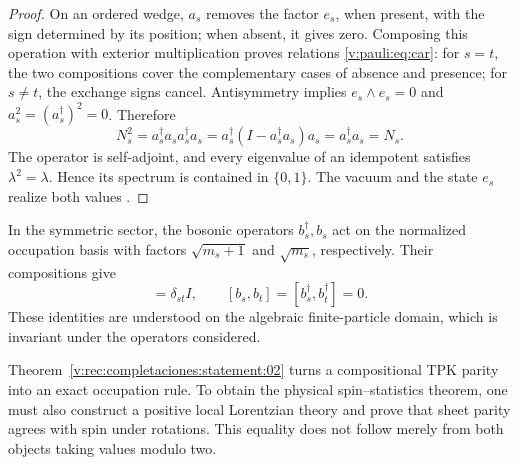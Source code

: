 \begin{proof}
On an ordered wedge, \(a_s\) removes the factor \(e_s\), when present,
with the sign determined by its position; when absent, it gives zero. Composing
this operation with exterior multiplication proves relations
\eqref{v:pauli:eq:car}: for \(s=t\), the two compositions cover the
complementary cases of absence and presence; for \(s\ne t\), the exchange
signs cancel. Antisymmetry implies
\(e_s\wedge e_s=0\) and
\(a_s^2=(a_s^\dagger)^2=0\). Therefore
\begin{equation}
 N_s^2=a_s^\dagger a_s a_s^\dagger a_s
 =a_s^\dagger(I-a_s^\dagger a_s)a_s
 =a_s^\dagger a_s=N_s.
 \label{v:pauli:eq:prueba-idempotencia}
\end{equation}
The operator is self-adjoint, and every eigenvalue of an idempotent satisfies
\(\lambda^2=\lambda\). Hence its spectrum is contained in
\(\{0,1\}\). The vacuum and the state \(e_s\) realize both values
\cite{Pauli1925,Dirac1926}.
\end{proof}

In the symmetric sector, the bosonic operators \(b_s^\dagger,b_s\)
act on the normalized occupation basis with factors
\(\sqrt{m_s+1}\) and \(\sqrt{m_s}\), respectively. Their compositions
give
\begin{equation}
 [b_s,b_t^\dagger]=\delta_{st}I,
 \qquad [b_s,b_t]=[b_s^\dagger,b_t^\dagger]=0.
 \label{v:pauli:eq:ccr}
\end{equation}
These identities are understood on the algebraic finite-particle domain,
which is invariant under the operators considered.

Theorem~\ref{v:rec:completaciones:statement:02} turns a compositional TPK parity into an exact
occupation rule. To obtain the physical spin--statistics theorem, one must
also construct a positive local Lorentzian theory and prove that
sheet parity agrees with spin under rotations. This equality does not
follow merely from both objects taking values modulo two.
